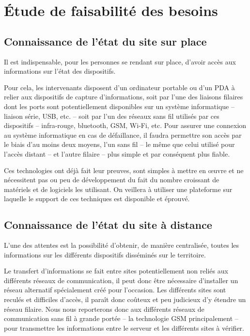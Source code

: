 \documentclass[a4paper, 11pt]{article}
\begin{document}
\section{Étude de faisabilité des besoins}

\subsection{Connaissance de l'état du site sur place}
Il est indispensable, pour les personnes se rendant sur place, d'avoir
accès aux informations sur l'état des dispositifs.

Pour cela, les intervenants disposent d'un ordinateur portable
ou d'un PDA à relier aux dispositifs de capture d'informations,
soit par l'une des liaisons filaires dont les ports sont
potentiellement disponibles sur un système informatique -- liaison
série, USB, etc. -- soit par l'un des réseaux sans fil
utilisés par ces dispositifs -- infra-rouge, bluetooth, GSM, Wi-Fi,
etc. Pour assurer une connexion au système informatique en
cas de défaillance, il faudra permettre son accès par le biais d'au
moins deux moyens, l'un sans fil -- le même que celui utilisé pour
l'accès distant -- et l'autre filaire -- plus simple et par conséquent
plus fiable.

Ces technologies ont déjà fait leur preuves, sont simples à mettre en
œuvre et ne nécessitent pas ou peu de développement du fait du nombre
croissant de matériels et de logiciels les utilisant. On veillera à
utiliser une plateforme sur laquelle le support de ces techniques
est disponible et éprouvé.

\subsection{Connaissance de l'état du site à distance}
L'une des attentes est la possibilité d'obtenir, de manière
centralisée, toutes les informations sur les différents dispositifs
disséminés sur le territoire.

Le transfert d'informations se fait entre sites potentiellement non
reliés aux différents réseaux de communication, il peut donc être
nécessaire d'installer un réseau alternatif spécialement créé pour
l'occasion. Les différents sites sont reculés et difficiles d'accès,
il paraît donc coûteux et peu judicieux d'y étendre un réseau
filaire. Nous nous reporterons donc aux différents réseaux de
communication sans fil à grande portée -- la technologie GSM
principalement -- pour transmettre les informations entre le serveur
et les différents sites à vérifier.
\end{document}
